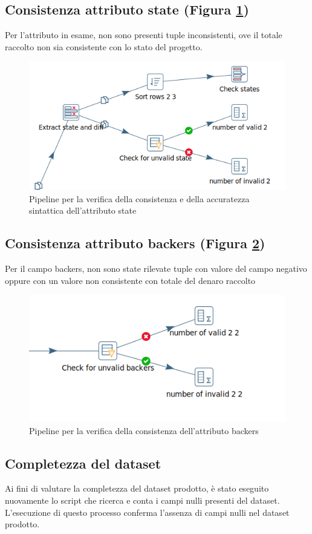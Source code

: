 \subsection{Consistenza attributo state (Figura \ref{fig:dqtstate})}
Per l'attributo in esame, non sono presenti tuple inconsistenti, ove il totale raccolto non sia consistente con lo stato del progetto.

\begin{figure}[h!]
	\centering
	\includegraphics[width=0.6\linewidth]{images/DQT_state}
	\caption{Pipeline per la verifica della consistenza e della accuratezza sintattica dell'attributo state}
	\label{fig:dqtstate}
\end{figure}

\subsection{Consistenza attributo backers (Figura \ref{fig:dqtbackers})}
Per il campo backers, non sono state rilevate tuple con valore del campo negativo oppure con un valore non consistente con totale del denaro raccolto

\begin{figure}[h!]
	\centering
	\includegraphics[width=0.7\linewidth]{images/DQT_backers}
	\caption{Pipeline per la verifica della consistenza dell'attributo backers}
	\label{fig:dqtbackers}
\end{figure}

\subsection{Completezza del dataset}
Ai fini di valutare la completezza del dataset prodotto, è stato eseguito nuovamente lo script che ricerca e conta i campi nulli presenti del dataset. L'esecuzione di questo processo conferma l'assenza di campi nulli nel dataset prodotto.

